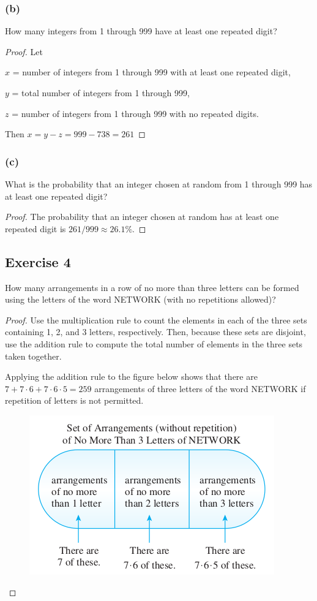 \documentclass[14pt]{extarticle}
\begin{document}
\subsubsection{(b)}
How many integers from 1 through 999 have at least one repeated digit?

\begin{proof}
Let 

$x$ = number of integers from 1 through 999 with at least one repeated digit,

$y$ = total number of integers from 1 through 999,

$z$ = number of integers from 1 through 999 with no repeated digits.

Then \(x = y - z = 999 - 738 = 261\)
\end{proof}

\subsubsection{(c)}
What is the probability that an integer chosen at random from 1 through 999 has at least one repeated digit?

\begin{proof}
The probability that an integer chosen at random has at least one repeated digit is \(261/999 \approx 26.1\%\).
\end{proof}

\subsection{Exercise 4}
How many arrangements in a row of no more than three letters can be formed using the letters of the word NETWORK 
(with no repetitions allowed)?

\begin{proof}
Use the multiplication rule to count the elements in each of the three sets containing 1, 2, and 3 letters, respectively. 
Then, because these sets are disjoint, use the addition rule to compute the total number of elements in the three sets 
taken together.

Applying the addition rule to the figure below shows that there are \(7 + 7 \cdot 6 + 7 \cdot 6 \cdot 5 = 259\) 
arrangements of three letters of the word NETWORK if repetition of letters is not permitted.

\begin{figure}[ht!]
\centering
\includegraphics[scale=0.5]{../images/9.3.4.png}
\end{figure}
\end{proof}
\end{document}
